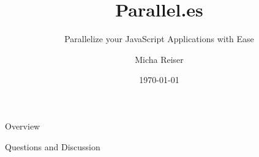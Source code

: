 \documentclass[aspectratio=169]{beamer}
\author{Micha Reiser}
\title{Parallel.es}
\subtitle{Parallelize your JavaScript Applications with Ease}
\institute{HSR}
\date{\today}
\begin{document}
\begin{frame}
	\maketitle
\end{frame}

\begin{frame}{Overview}
	\tableofcontents
\end{frame}









\begin{frame}[standout]
	Questions and Discussion
\end{frame}


\end{document}
